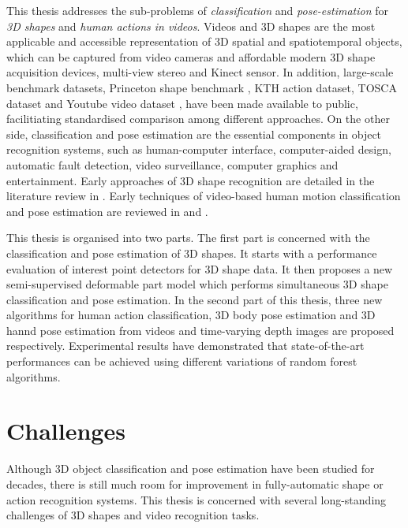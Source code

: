 This thesis addresses the sub-problems of \emph{classification} and \emph{pose-estimation} for \emph{3D shapes} and \emph{human actions in videos}. 
Videos and 3D shapes are the most applicable and accessible representation of 3D spatial and spatiotemporal objects, which can be captured from video cameras and affordable modern 3D shape acquisition devices, \eg multi-view stereo \cite{Vogiatzis2011} and Kinect sensor. 
In addition, large-scale benchmark datasets, \eg Princeton shape benchmark \cite{Shilane2004},  KTH action dataset\cite{Schuldt2004}, TOSCA dataset \cite{Bronstein2011} and Youtube video dataset \cite{Liu2009}, have been made available to public, facilitiating standardised comparison among different approaches. 
On the other side, classification and pose estimation are the essential components in object recognition systems, such as human-computer interface, computer-aided design, automatic fault detection, video surveillance, computer graphics and entertainment. 
Early approaches of 3D shape recognition are detailed in the literature review in \cite{Besl1985}. Early techniques of video-based human motion classification and pose estimation are reviewed in \cite{Cedras1995, Moeslund2001, Turaga2008} and \cite{Aggarwal1999, Poppe2007}. 

This thesis is organised into two parts.  
The first part is concerned with the classification and pose estimation of 3D shapes. It starts with a performance evaluation of interest point detectors for 3D shape data. It then proposes a new semi-supervised deformable part model which performs simultaneous 3D shape classification and pose estimation. In the second part of this thesis, three new algorithms for human action classification, 3D body pose estimation and 3D hannd pose estimation from videos and time-varying depth images are proposed respectively. Experimental results have demonstrated that state-of-the-art performances can be achieved using different variations of random forest algorithms.    

\section{Challenges}

Although 3D object classification and pose estimation have been studied for decades, there is still much room for improvement in fully-automatic shape or action recognition systems. 
This thesis is concerned with several long-standing challenges of 3D shapes and video recognition tasks.  

